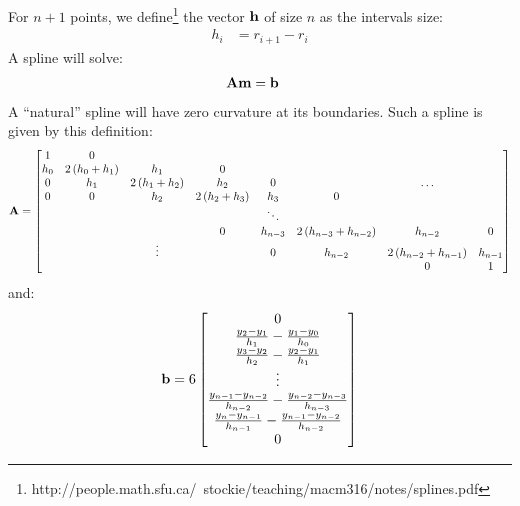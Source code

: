 \documentclass[12pt,letterpaper]{article}
\newcommand{\url}[1]{{\color{blue}#1}}
\begin{document}
For $n+1$ points, we define\footnote{\url{http://people.math.sfu.ca/~stockie/teaching/macm316/notes/splines.pdf}}
the vector $\textbf{h}$ of size $n$ as the intervals size:
\begin{align}
h_{i} & = r_{i+1} - r_{i}
\end{align}
A spline will solve:
\begin{align}
\textbf{A} \textbf{m} & = \textbf{b}
\end{align}
A ``natural'' spline will have zero curvature at its boundaries. Such a spline is given by this definition:
\begin{align}
\textbf{A} =
\begin{bmatrix}
1       & 0                 &                   &                   &           &                       &                       &   \\
h_{0}   & 2\left( h_{0}+h_{1} \right) & h_{1}             & 0                 &           &                       &                       &   \\
0       & h_{1}             & 2\left( h_{1}+h_{2} \right) & h_{2}             & 0         &                       & \hdots                &   \\
0       & 0                 & h_{2}             & 2\left( h_{2}+h_{3} \right) & h_{3}     & 0                     &                       &   \\
        &                   &                   &                   & \ddots    &                       &                       &   \\
        &                   &                   & 0                 & h_{n-3}   & 2\left( h_{n-3}+h_{n-2} \right) & h_{n-2}               & 0 \\
        &                   & \vdots            &                   & 0         & h_{n-2}               & 2\left( h_{n-2}+h_{n-1} \right) & h_{n-1} \\
        &                   &                   &                   &           &                       & 0                     & 1
\end{bmatrix}
\end{align}
and:
\begin{align}
\textbf{b} = 6
\begin{bmatrix}
0 \\
\frac{y_{2}-y_{1}}{h_{1}} - \frac{y_{1}-y_{0}}{h_{0}}  \\
\frac{y_{3}-y_{2}}{h_{2}} - \frac{y_{2}-y_{1}}{h_{1}}  \\
\vdots \\
\frac{y_{n-1}-y_{n-2}}{h_{n-2}} - \frac{y_{n-2}-y_{n-3}}{h_{n-3}}  \\
\frac{y_{n}  -y_{n-1}}{h_{n-1}} - \frac{y_{n-1}-y_{n-2}}{h_{n-2}}  \\
0
\end{bmatrix}
\end{align}
\end{document}
